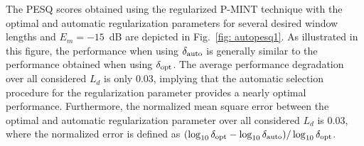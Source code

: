 \documentclass[10pt]{IEEEtran}
\begin{document}
The PESQ scores obtained using the regularized P-MINT technique with the optimal and automatic regularization parameters for several desired window lengths and $E_m = -15$~dB are depicted in Fig.~\ref{fig: autopesq1}.
As illustrated in this figure, the performance when using $\delta_{\rm auto}$ is generally similar to the performance obtained when using $\delta_{\rm opt}$.
The average performance degradation over all considered $L_d$ is only $0.03$, implying that the automatic selection procedure for the regularization parameter provides a nearly optimal performance.
Furthermore, the normalized mean square error between the optimal and automatic regularization parameter over all considered $L_d$ is $0.03$, where the normalized error is defined as $(\log_{10}\delta_{\rm opt} - \log_{10}\delta_{\rm auto})/\log_{10}\delta_{\rm opt}$.
\end{document}
